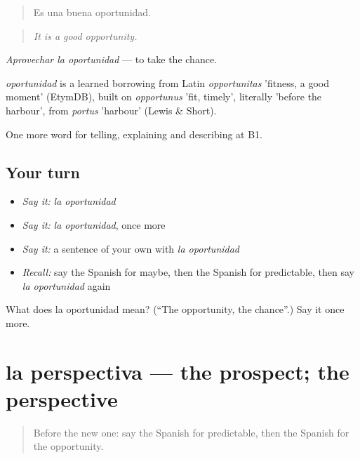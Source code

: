 \begin{quote}
Es una buena oportunidad.
\end{quote}

\begin{quote}
\emph{It is a good opportunity.}
\end{quote}

\emph{Aprovechar la oportunidad} — to take the chance.

\begin{cousinweb}
\emph{oportunidad} is a learned borrowing from Latin \emph{opportunitas} 'fitness, a good moment' (EtymDB), built on \emph{opportunus} 'fit, timely', literally 'before the harbour', from \emph{portus} 'harbour' (Lewis \& Short).
\end{cousinweb}

\begin{grammarlens}[title={What you've built}]
One more word for telling, explaining and describing at B1.
\end{grammarlens}

\subsection*{Your turn}
\begin{itemize}
\raggedright
  \item \emph{Say it:} \emph{la oportunidad}
  \item \emph{Say it:} \emph{la oportunidad}, once more
  \item \emph{Say it:} a sentence of your own with \emph{la oportunidad}
  \item \emph{Recall:} say the Spanish for maybe, then the Spanish for predictable, then say \emph{la oportunidad} again
\end{itemize}

\begin{tcolorbox}[breakable,colback=teal!4,colframe=teal!35!black,title={Before you move on}]
What does la oportunidad mean? (\textquotedblleft{}The opportunity, the chance\textquotedblright{}.) Say it once more.
\end{tcolorbox}
\section[la perspectiva]{la perspectiva — the prospect; the perspective}

\label{lesson:ES-C619-perspectiva}



\begin{quote}
Before the new one: say the Spanish for predictable, then the Spanish for the opportunity.
\end{quote}

